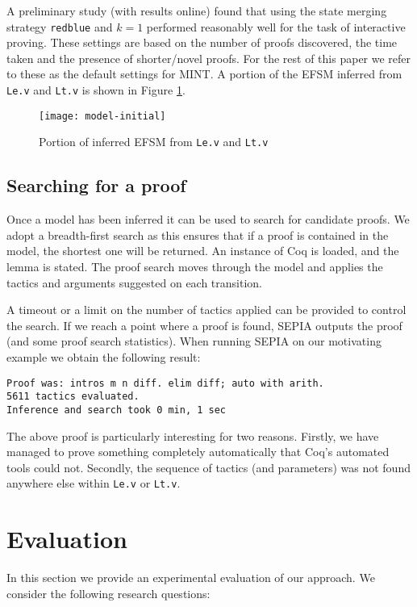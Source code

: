 \documentclass{llncs}
\begin{document}
A preliminary study (with results online) found that using the state merging strategy \texttt{redblue} and $k=1$ performed reasonably well for the task of interactive proving. These settings are based on the number of proofs discovered, the time taken and the presence of shorter/novel proofs. For the rest of this paper we refer to these as the default settings for MINT. A portion of the EFSM inferred from {\tt Le.v} and {\tt Lt.v} is shown in Figure \ref{fig:efsmexample}.

\begin{figure}[H]
\centering
\texttt{[image: model-initial]}
\caption{Portion of inferred EFSM from {\tt Le.v} and {\tt Lt.v}}
\label{fig:efsmexample}
\end{figure}

\subsection{Searching for a proof}
Once a model has been inferred it can be used to search for candidate proofs. We adopt a breadth-first search as this ensures that if a proof is contained in the model, the shortest one will be returned. An instance of Coq is loaded, and the lemma is stated. The proof search moves through the model and applies the tactics and arguments suggested on each transition. 

A timeout or a limit on the number of tactics applied can be provided to control the search. If we reach a point where a proof is found, SEPIA outputs the proof (and some proof search statistics). When running SEPIA on our motivating example we obtain the following result:

\begin{lstlisting}
Proof was: intros m n diff. elim diff; auto with arith.
5611 tactics evaluated.
Inference and search took 0 min, 1 sec
\end{lstlisting}

The above proof is particularly interesting for two reasons. Firstly, we have managed to prove something completely automatically that Coq's automated tools could not. Secondly, the sequence of tactics (and parameters) was not found anywhere else within \texttt{Le.v} or \texttt{Lt.v}.

\section{Evaluation}
\label{sec:eval}
In this section we provide an experimental evaluation of our approach. We consider the following research questions:
\end{document}
